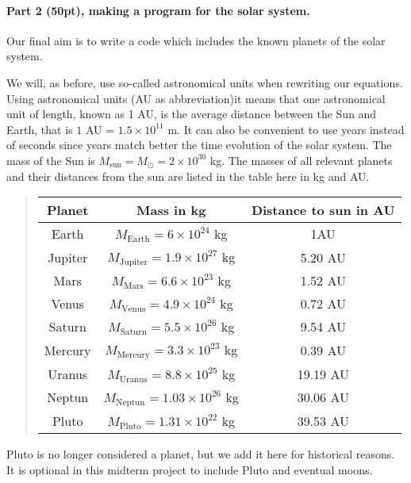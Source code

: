 \documentclass[%
oneside,                 %
final,                   %
10pt]{article}
\begin{document}
\noindent
\paragraph{Part 2 (50pt), making a program for the solar system.}
Our final aim is to write a code which includes the known planets of the solar system. 

We will, as before, use so-called astronomical units when rewriting our equations. 
Using astronomical units (AU as abbreviation)it means that 
one astronomical unit of length, known as 1 AU, is the average distance between the Sun and Earth, that is
$1$ AU = $1.5\times 10^{11}$ m.  It can also be convenient to use years instead of seconds since years match
better the time evolution of the solar system. The mass of the Sun is $M_{\mathrm{sun}}=M_{\odot}=2\times 10^{30}$ kg. The masses of all relevant planets and their distances from the sun are listed in the table here in kg and AU.


\begin{quote}
\begin{tabular}{ccc}
\hline
\multicolumn{1}{c}{ Planet } & \multicolumn{1}{c}{ Mass in kg } & \multicolumn{1}{c}{ Distance to  sun in AU } \\
\hline
Earth   & $M_{\mathrm{Earth}}=6\times 10^{24}$ kg     & 1AU                    \\
Jupiter & $M_{\mathrm{Jupiter}}=1.9\times 10^{27}$ kg & 5.20 AU                \\
Mars    & $M_{\mathrm{Mars}}=6.6\times 10^{23}$ kg    & 1.52 AU                \\
Venus   & $M_{\mathrm{Venus}}=4.9\times 10^{24}$ kg   & 0.72 AU                \\
Saturn  & $M_{\mathrm{Saturn}}=5.5\times 10^{26}$ kg  & 9.54 AU                \\
Mercury & $M_{\mathrm{Mercury}}=3.3\times 10^{23}$ kg & 0.39 AU                \\
Uranus  & $M_{\mathrm{Uranus}}=8.8\times 10^{25}$ kg  & 19.19 AU               \\
Neptun  & $M_{\mathrm{Neptun}}=1.03\times 10^{26}$ kg & 30.06 AU               \\
Pluto   & $M_{\mathrm{Pluto}}=1.31\times 10^{22}$ kg  & 39.53 AU               \\
\hline
\end{tabular}
\end{quote}

\noindent
Pluto is no longer considered  a planet, but we add it here for historical reasons. It is optional in this midterm project to include Pluto and eventual moons. 
\end{document}
